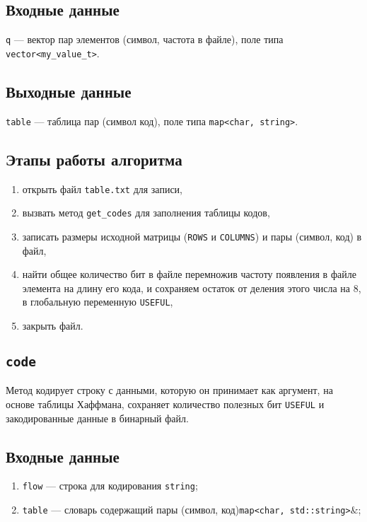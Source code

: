 \subsection*{Входные данные}
\texttt{q} --- вектор пар элементов (символ, частота в файле), поле типа \texttt{vector<my\_value\_t>}.

\subsection*{Выходные данные}
\texttt{table} --- таблица пар (символ код), поле типа \texttt{map<char, string>}.

\subsection*{Этапы работы алгоритма}
\begin{enumerate}
	\item открыть файл \texttt{table.txt} для записи,
	\item вызвать метод \texttt{get\_codes} для заполнения таблицы кодов,
	\item записать размеры исходной матрицы (\texttt{ROWS} и \texttt{COLUMNS}) и пары (символ, код) в файл,
	\item найти общее количество бит в файле перемножив частоту появления в файле элемента на длину его кода, и сохраняем остаток от деления этого числа на 8, в глобальную переменную \texttt{USEFUL},
	\item закрыть файл.
\end{enumerate}

\subsection{\texttt{code}}
Метод кодирует строку с данными, которую он принимает как аргумент, на основе таблицы Хаффмана, сохраняет количество полезных бит \texttt{USEFUL} и закодированные данные в бинарный файл.

\subsection*{Входные данные}
\begin{enumerate}
	\item \texttt{flow} --- строка для кодирования \texttt{string};
	\item \texttt{table} --- словарь содержащий пары (символ, код)\texttt{map<char, std::string>$\&$};
\end{enumerate}

